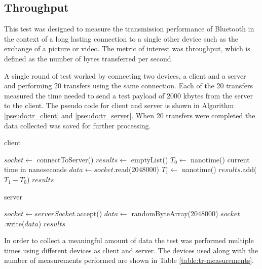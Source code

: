 \subsection{Throughput}
This test was designed to measure the transmission performance of Bluetooth in the context of a long lasting connection to a single other device such as the exchange of a picture or video.
The metric of interest was throughput, which is defined as the number of bytes transferred per second.

A single round of test worked by connecting two devices, a client and a server and performing 20 transfers using the same connection.
Each of the 20 transfers measured the time needed to send a test payload of 2000 kbytes from the server to the client.
The pseudo code for client and server is shown in Algorithm \ref{pseudo:tr_client} and \ref{pseudo:tr_server}.
When 20 transfers were completed the data collected was saved for further processing.

\begin{algorithm}
	\begin{algorithmic}[1]
  		\caption{client}
  		\label{pseudo:tr_client}
		\State $socket \leftarrow$ connectToServer()
		\State $results \leftarrow$ emptyList()
		    \State $T_0 \leftarrow$ nanotime() \Comment current time in nanoseconds
			\State $data \leftarrow socket$.read($2048000$)
			\State $T_1 \leftarrow$ nanotime()
			\State $results$.add($T_1 - T_0$)
		\EndFor
		\State \Return $results$
  	\end{algorithmic}
\end{algorithm}

\begin{algorithm}
	\begin{algorithmic}[1]
  		\caption{server}
  		\label{pseudo:tr_server}
  		\State $socket \leftarrow serverSocket$.accept()
		\Repeat
		    \State $data \leftarrow$ randomByteArray($2048000$)
            \State $socket$.write($data$)
		\State \Return $results$
  	\end{algorithmic}
\end{algorithm}

In order to collect a meaningful amount of data the test was performed multiple times using different devices as client and server.
The devices used along with the number of measurements performed are shown in Table \ref{table:tr-measurements}.

